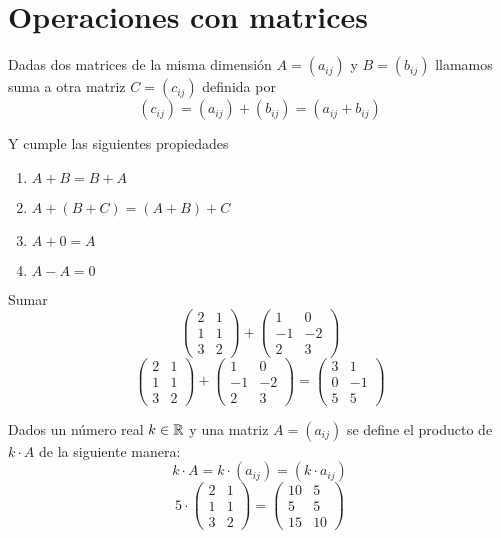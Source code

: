 \section{Operaciones con matrices}


\begin{definicion}[Suma]
Dadas dos matrices de la misma dimensión $A=(a_{ij})$ y $B=(b_{ij})$ llamamos suma a otra matriz $C=(c_{ij})$ definida por 
$$(c_{ij})=(a_{ij})+(b_{ij})=(a_{ij}+b_{ij})$$

Y cumple las siguientes propiedades
\begin{multicols}{2}
	\begin{enumerate}
		\item $A+B=B+A$
		\item $A+(B+C)=(A+B)+C$
		\item$A+0=A$
		\item $A-A=0$
	\end{enumerate}
	\end{multicols}
\end{definicion}

\begin{ejemplo}
Sumar $$   \begin{pmatrix}
	2 & 1 \\
	1 & 1 \\
	3 & 2
\end{pmatrix} 
     +
     \begin{pmatrix}
	1 & 0 \\
	-1 & -2 \\
	2 & 3
\end{pmatrix}    $$
\tcblower
$$   \begin{pmatrix}
	2 & 1 \\
	1 & 1 \\
	3 & 2
\end{pmatrix} 
     +
     \begin{pmatrix}
	1 & 0 \\
	-1 & -2 \\
	2 & 3
\end{pmatrix}    = \begin{pmatrix}
	3 & 1 \\
	0 &-1 \\
	5 & 5
\end{pmatrix}    $$
\end{ejemplo}


\begin{definicion}
Dados un número real $k\in \mathbb{R}$ y una matriz $A=(a_{ij})$ se define el producto de $k\cdot A$ de la siguiente manera:\\
$$k\cdot A=k\cdot (a_{ij})= (k\cdot a_{ij})$$
 $$5\cdot\begin{pmatrix}
	2 & 1 \\
	1 & 1 \\
	3 & 2
\end{pmatrix}= \begin{pmatrix}
	10 & 5 \\
	5 & 5 \\
	15 & 10
\end{pmatrix}  $$
\end{definicion}

